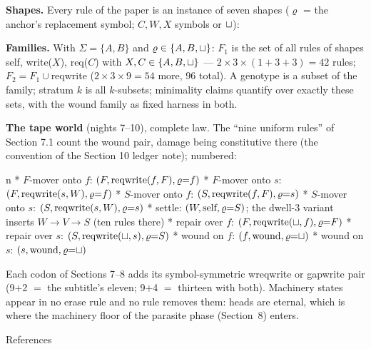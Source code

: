 {\bf Shapes.} Every rule of the paper is an instance of seven
shapes ($\varrho$ = the anchor's replacement symbol; $C,W,X$
symbols or $\sqcup$):

\medskip
\noindent{}
\medskip

{\bf Families.} With $\Sigma=\{A,B\}$ and
$\varrho\in\{A,B,\sqcup\}$: $F_1$ is the set of all rules of
shapes self, write($X$), req($C$) with $X,C\in\{A,B,\sqcup\}$ ---
$2\times3\times(1{+}3{+}3)=42$ rules; $F_2=F_1\cup{}$reqwrite
($2\times3\times9=54$ more, 96 total). A genotype is a subset of
the family; stratum $k$ is all $k$-subsets; minimality claims
quantify over exactly these sets, with the wound family as fixed
harness in both.

{\bf The tape world} (nights 7--10), complete law. The
“nine uniform rules” of Section 7.1 count the wound pair, damage
being constitutive there (the convention of the Section 10 ledger
note); numbered:

\begitems\style n
* $F$-mover onto $f$: $(F,\hbox{reqwrite}(f,F),\varrho{=}f)$
* $F$-mover onto $s$: $(F,\hbox{reqwrite}(s,W),\varrho{=}f)$
* $S$-mover onto $f$: $(S,\hbox{reqwrite}(f,F),\varrho{=}s)$
* $S$-mover onto $s$: $(S,\hbox{reqwrite}(s,W),\varrho{=}s)$
* settle: $(W,\hbox{self},\varrho{=}S)$; the dwell-3 variant
inserts $W{\to}V{\to}S$ (ten rules there)
* repair over $f$: $(F,\hbox{reqwrite}(\sqcup,f),\varrho{=}F)$
* repair over $s$: $(S,\hbox{reqwrite}(\sqcup,s),\varrho{=}S)$
* wound on $f$: $(f,\hbox{wound},\varrho{=}\sqcup)$
* wound on $s$: $(s,\hbox{wound},\varrho{=}\sqcup)$
\enditems

\noindent Each codon of Sections 7--8 adds its symbol-symmetric
wreqwrite or gapwrite pair (9${+}$2 $=$ the subtitle's eleven;
9${+}$4 $=$ thirteen with both). Machinery states appear in no
erase rule and no rule removes them: heads are eternal, which is
where the machinery floor of the parasite phase (Section~8)
enters.

\sec References

